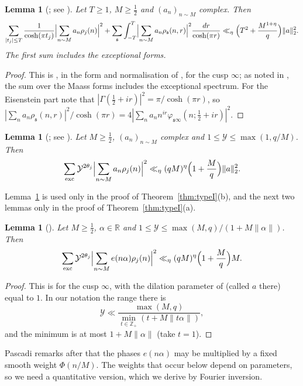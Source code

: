 \documentclass[11pt]{amsart}
\newtheorem{lemma}[theorem]{Lemma}
\theoremstyle{remark}
\theoremstyle{definition}
\numberwithin{equation}{section}
\newcommand{\Z}{\mathbb{Z}}
\newcommand{\R}{\mathbb{R}}
\newcommand{\gs}{\mathfrak{s}}
\newcommand{\exc}{\mathrm{exc}}
\begin{document}
\begin{lemma}[{\cite[Theorem~2]{DI}; see \cite[Lemma~H]{Pas}}]\label{lem:DI2}
Let $T\ge1$, $M\ge\frac12$ and $(a_n)_{n\sim M}$ complex. Then
\[
\sum_{|t_j|\le T}\frac{1}{\cosh(\pi t_j)}\Bigl|\sum_{n\sim M}a_n\rho_j(n)\Bigr|^2+\sum_\gs\int_{-T}^T\Bigl|\sum_{n\sim M}a_n\rho_\gs(n,r)\Bigr|^2\frac{dr}{\cosh(\pi r)}\ll_\eta\Bigl(T^2+\frac{M^{1+\eta}}q\Bigr)\|a\|_2^2.
\]
The first sum includes the exceptional forms.
\end{lemma}

\begin{proof}
This is \cite[Theorem~2]{DI}, in the form and normalisation of \cite[Lemma~H]{Pas}, for the cusp $\infty$; as noted in \cite{Pas}, the sum over the Maass forms includes the exceptional spectrum. For the Eisenstein part note that $|\Gamma(\frac12+ir)|^2=\pi/\cosh(\pi r)$, so $|\sum_na_n\rho_\gs(n,r)|^2/\cosh(\pi r)=4|\sum_na_nn^{ir}\varphi_{\gs\infty}(n;\frac12+ir)|^2$.
\end{proof}

\begin{lemma}[{\cite[Theorem~5]{DI}; see \cite[Theorem~A]{Pas}}]\label{lem:DI5}
Let $M\ge\frac12$, $(a_n)_{n\sim M}$ complex and $1\le\mathcal Y\le\max(1,q/M)$. Then
\[
\sum_{\exc}\mathcal Y^{2\theta_j}\Bigl|\sum_{n\sim M}a_n\rho_j(n)\Bigr|^2\ll_\eta(qM)^\eta\Bigl(1+\frac Mq\Bigr)\|a\|_2^2.
\]
\end{lemma}

Lemma~\ref{lem:DI5} is used only in the proof of Theorem~\ref{thm:typeI}(b), and the next two lemmas only in the proof of Theorem~\ref{thm:typeI}(a).

\begin{lemma}[{\cite[Theorem~2]{Pas}}]\label{lem:Pas}
Let $M\ge\frac12$, $\alpha\in\R$ and $1\le\mathcal Y\le\max(M,q)/(1+M\|\alpha\|)$. Then
\[
\sum_{\exc}\mathcal Y^{2\theta_j}\Bigl|\sum_{n\sim M}e(n\alpha)\rho_j(n)\Bigr|^2\ll_\eta(qM)^\eta\Bigl(1+\frac Mq\Bigr)M.
\]
\end{lemma}

\begin{proof}
This is \cite[Theorem~2]{Pas} for the cusp $\infty$, with the dilation parameter of \cite{Pas} (called $a$ there) equal to $1$. In our notation the range there is
\[
\mathcal Y\ll\frac{\max(M,q)}{\min_{t\in\Z_+}(t+M\|t\alpha\|)},
\]
and the minimum is at most $1+M\|\alpha\|$ (take $t=1$).
\end{proof}

Pascadi remarks after \cite[Theorem~2]{Pas} that the phases $e(n\alpha)$ may be multiplied by a fixed smooth weight $\Phi(n/M)$. The weights that occur below depend on parameters, so we need a quantitative version, which we derive by Fourier inversion.
\end{document}
